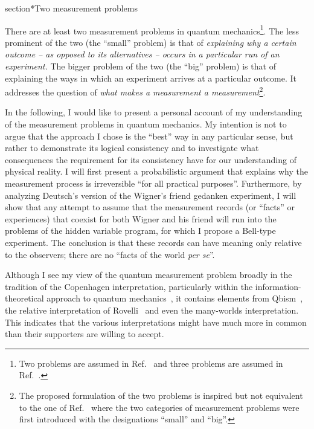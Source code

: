\documentclass[12pt]{article}
\begin{document}
\setcounter{page}{1}
section*{Two measurement problems}

There are at least two measurement problems in quantum mechanics\footnote{Two problems are assumed in Ref.~\cite{bub,pitowsky} and three problems are assumed in Ref.~\cite{maudlin}.}. The less prominent of the two (the ``small'' problem) is that of {\em explaining why a certain outcome -- as opposed to its alternatives -- occurs in a particular run of an experiment.} The bigger problem of the two (the ``big'' problem) is that of explaining the ways in which an experiment arrives at a particular outcome. It addresses the question of {\em what makes a measurement a measurement}\footnote{The proposed formulation of the two problems is inspired but not equivalent to the one of Ref.~\cite{bub,pitowsky} where the two categories of measurement problems were first introduced with the designations ``small'' and ``big''.}. 

In the following, I would like to present a personal account of my understanding of the measurement problems in quantum mechanics. My intention is not to argue that the approach I chose is the ``best'' way in any particular sense, but rather to demonstrate its logical consistency and to investigate what consequences the requirement for its consistency have for our understanding of physical reality. I will first present a probabilistic argument that explains why the measurement process is irreversible ``for all practical purposes''. Furthermore, by analyzing Deutsch's version of the Wigner's friend gedanken experiment, I will show that any attempt to assume that the measurement records (or ``facts'' or experiences) that coexist for both Wigner and his friend will run into the problems of the hidden variable program, for which I propose a Bell-type experiment. The conclusion is that these records can have meaning only relative to the observers; there are no ``facts of the world {\it per se}''.

Although I see my view of the quantum measurement problem broadly in the tradition of the Copenhagen interpretation, particularly within the information-theoretical approach to quantum mechanics~\cite{cbaz}, it contains elements from Qbism~\cite{qbism}, the relative interpretation of Rovelli~\cite{rovelli} and even the many-worlds interpretation. This indicates that the various interpretations might have much more in common than their supporters are willing to accept.
\end{document}
